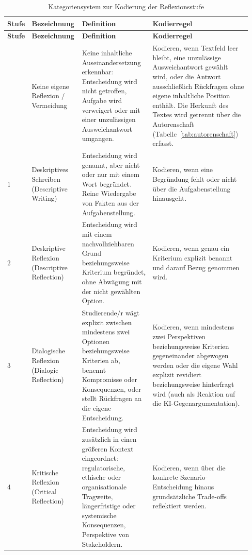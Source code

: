 \begingroup
\setlength{\tabcolsep}{4pt}
\begin{longtable}{p{1cm} p{2.8cm} p{4.6cm} p{5cm}}
	\caption{Kategoriensystem zur Kodierung der Reflexionsstufe}
	\label{tab:kategoriensystem} \\
	\toprule
	\textbf{Stufe} & \textbf{Bezeichnung} & \textbf{Definition} & \textbf{Kodierregel} \\
	\midrule
	\endfirsthead
	\toprule
	\textbf{Stufe} & \textbf{Bezeichnung} & \textbf{Definition} & \textbf{Kodierregel} \\
	\midrule
	\endhead
	\bottomrule
	\endfoot
	0 & Keine eigene Reflexion / Vermeidung &
	Keine inhaltliche Auseinandersetzung erkennbar: Entscheidung wird nicht getroffen, Aufgabe wird
	verweigert oder mit einer unzulässigen Ausweichantwort umgangen. &
	Kodieren, wenn Textfeld leer bleibt, eine unzulässige Ausweichantwort gewählt wird, oder die
	Antwort ausschließlich Rückfragen ohne eigene inhaltliche Position enthält. Die Herkunft des
		Textes wird getrennt über die Autorenschaft (Tabelle~\ref{tab:autorenschaft}) erfasst. \\
	1 & Deskriptives Schreiben (Descriptive Writing) &
	Entscheidung wird genannt, aber nicht oder nur mit einem Wort begründet. Reine Wiedergabe von
	Fakten aus der Aufgabenstellung. &
	Kodieren, wenn eine Begründung fehlt oder nicht über die Aufgabenstellung hinausgeht. \\
	2 & Deskriptive Reflexion (Descriptive Reflection) &
	Entscheidung wird mit einem nachvollziehbaren Grund beziehungsweise Kriterium begründet, ohne
	Abwägung mit der nicht gewählten Option. &
	Kodieren, wenn genau ein Kriterium explizit benannt und darauf Bezug genommen wird. \\
	3 & Dialogische Reflexion (Dialogic Reflection) &
	Studierende/r wägt explizit zwischen mindestens zwei Optionen beziehungsweise Kriterien ab,
	benennt Kompromisse oder Konsequenzen, oder stellt Rückfragen an die eigene Entscheidung. &
	Kodieren, wenn mindestens zwei Perspektiven beziehungsweise Kriterien gegeneinander abgewogen
	werden oder die eigene Wahl explizit revidiert beziehungsweise hinterfragt wird (auch als Reaktion
	auf die KI-Gegenargumentation). \\
	4 & Kritische Reflexion (Critical Reflection) &
	Entscheidung wird zusätzlich in einen größeren Kontext eingeordnet: regulatorische, ethische oder
	organisationale Tragweite, längerfristige oder systemische Konsequenzen, Perspektive von
	Stakeholdern. &
	Kodieren, wenn über die konkrete Szenario-Entscheidung hinaus grundsätzliche Trade-offs
	reflektiert werden. \\
\end{longtable}
\endgroup

